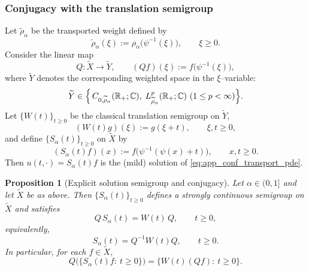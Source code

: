 \documentclass[preprint,12pt]{elsarticle}
\newtheorem{proposition}{Proposition}
\newcommand{\R}{\mathbb {R}}
\newcommand{\C}{\mathbb {C}}
\begin{document}
\subsubsection*{Conjugacy with the translation semigroup}

Let $\widetilde\rho_\alpha$ be the transported weight defined by
\begin{equation}\label{eq:app_weight_transport}
\widetilde\rho_\alpha(\xi):=\rho_\alpha\bigl(\psi^{-1}(\xi)\bigr),\qquad \xi\ge0.
\end{equation}
Consider the linear map
\begin{equation}\label{eq:app_Q_def}
Q:\widetilde X\to \widetilde Y,\qquad (Qf)(\xi):=f\bigl(\psi^{-1}(\xi)\bigr),
\end{equation}
where $\widetilde Y$ denotes the corresponding weighted space in the $\xi$--variable:
\[
\widetilde Y \in \Bigl\{\, C_{0,\widetilde\rho_\alpha}(\R_+;\C),\;
L^p_{\widetilde\rho_\alpha}(\R_+;\C)\ (1\le p<\infty)\Bigr\}.
\]
Let $\{W(t)\}_{t\ge0}$ be the classical translation semigroup on $\widetilde Y$,
\begin{equation}\label{eq:app_W_def}
(W(t)g)(\xi):=g(\xi+t),\qquad \xi,t\ge0,
\end{equation}
and define $\{S_\alpha(t)\}_{t\ge0}$ on $\widetilde X$ by
\begin{equation}\label{eq:app_Salpha_def}
(S_\alpha(t)f)(x):=f\bigl(\psi^{-1}(\psi(x)+t)\bigr),\qquad x,t\ge0.
\end{equation}
Then $u(t,\cdot)=S_\alpha(t)f$ is the (mild) solution of \eqref{eq:app_conf_transport_pde}.

\begin{proposition}[Explicit solution semigroup and conjugacy]\label{prop:app_conjugacy_translation}
Let $\alpha\in(0,1]$ and let $\widetilde X$ be as above.
Then $\{S_\alpha(t)\}_{t\ge0}$ defines a strongly continuous semigroup on $\widetilde X$ and satisfies
\begin{equation}\label{eq:app_conjugacy_identity}
Q\,S_\alpha(t)=W(t)\,Q,\qquad t\ge0,
\end{equation}
equivalently,
\begin{equation}\label{eq:app_conjugacy_equiv}
S_\alpha(t)=Q^{-1}W(t)Q,\qquad t\ge0.
\end{equation}
In particular, for each $f\in\widetilde X$,
\[
Q\bigl(\{S_\alpha(t)f:\ t\ge0\}\bigr)=\{W(t)(Qf):\ t\ge0\}.
\]
\end{proposition}
\end{document}

